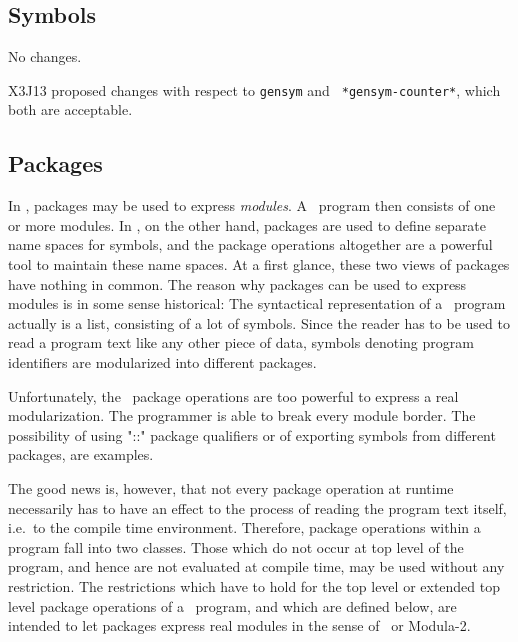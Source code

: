 \subsection{Symbols}

No changes. 

X3J13 proposed changes with respect to {\tt gensym} and {\tt
*gensym-counter*}, which both are acceptable.


\subsection{Packages}
\label{packages}

In , packages may be used to express {\em modules}. A \ program then
consists of one or more modules. In \CL, on the other hand, packages are 
used to define separate name spaces for symbols, and the package operations 
altogether are a powerful tool to maintain these name spaces. At a first 
glance, these two views of packages have nothing in common. The reason why 
packages can be used to express modules is in some sense historical: The 
syntactical representation of a \CL\ program actually is a list, consisting 
of a lot of symbols. Since the reader has to be used to read a program
text like 
any other piece of data, symbols denoting program identifiers are 
modularized into different packages. 

Unfortunately, the \CL\ package operations are too powerful to express
a real modularization. The programmer is able to break every module
border. The possibility of using "::" package qualifiers or of
exporting symbols from different packages, are examples.

The good news is, however, that not every package operation at runtime
necessarily has to have an effect to the process of reading the
program text
itself, i.e.\ to the compile time environment. Therefore, package
operations within a program fall into two classes. Those which do not
occur at top level of the program, and hence are not evaluated at
compile time, may be used without any restriction. The restrictions
which have to hold for the top level or extended top level package
operations of a \ program, and which are defined below, are
intended to let packages express real modules in the sense of \EL\ or
Modula-2.

%
%

